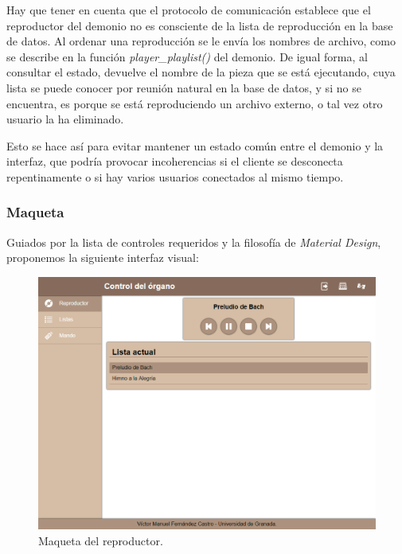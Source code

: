 Hay que tener en cuenta que el protocolo de comunicación establece que el reproductor del demonio no es consciente de la lista de reproducción en la base de datos. Al ordenar una reproducción se le envía los nombres de archivo, como se describe en la función \textit{player\_playlist()} del demonio. De igual forma, al consultar el estado, devuelve el nombre de la pieza que se está ejecutando, cuya lista se puede conocer por reunión natural en la base de datos, y si no se encuentra, es porque se está reproduciendo un archivo externo, o tal vez otro usuario la ha eliminado.

Esto se hace así para evitar mantener un estado común entre el demonio y la interfaz, que podría provocar incoherencias si el cliente se desconecta repentinamente o si hay varios usuarios conectados al mismo tiempo.

\subsubsection{Maqueta}

Guiados por la lista de controles requeridos y la filosofía de \textit{Material Design}, proponemos la siguiente interfaz visual:

\smallskip

\begin{figure}[H]
	\noindent \begin{centering}
		\includegraphics[width=\linewidth*3/4]{capitulo4/cap_reproductor}
		\par\end{centering}
	\smallskip
	\caption{\label{fig:cap_reproductor} Maqueta del reproductor.}
\end{figure} 

